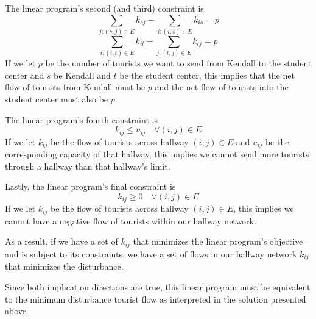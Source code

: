 \documentclass[12pt,twoside]{article}
\begin{document}
\begin{problems}
\begin{problemparts}
\begin{itemize}
  The linear program's second (and third) constraint is
  $$ \sum_{j:(s, j) \in E} k_{sj} - \sum_{i:(i, s) \in E} k_{is} = p $$
  $$ \sum_{i:(i, t) \in E} k_{it} - \sum_{j:(t, j) \in E} k_{tj} = p $$
  If we let $p$ be the number of tourists we want to send from Kendall to the
  student center and $s$ be Kendall and $t$ be the student center, this
  implies that the net flow of tourists from Kendall must be $p$ and the net
  flow of tourists into the student center must also be $p$.

  The linear program's fourth constraint is
  $$ k_{ij} \leq u_{ij}\quad \forall (i, j) \in E $$
  If we let $k_{ij}$ be the flow of tourists across hallway $(i, j) \in E$
  and $u_{ij}$ be the corresponding capacity of that hallway, this implies we
  cannot send more tourists through a hallway than that hallway's limit.

  Lastly, the linear program's final constraint is
  $$ k_{ij} \geq 0\quad \forall (i, j) \in E $$
  If we let $k_{ij}$ be the flow of tourists across hallway $(i, j) \in E$,
  this implies we cannot have a negative flow of tourists within our hallway
  network.

  As a result, if we have a set of $k_{ij}$ that minimizes the linear
  program's objective and is subject to its constraints, we have a set of
  flows in our hallway network $k_{ij}$ that minimizes the disturbance.

\end{itemize}

Since both implication directions are true, this linear program must be
equivalent to the minimum disturbance tourist flow as interpreted in the
solution presented above.

\problempart %


\end{problemparts}
\end{problems}
\end{document}
